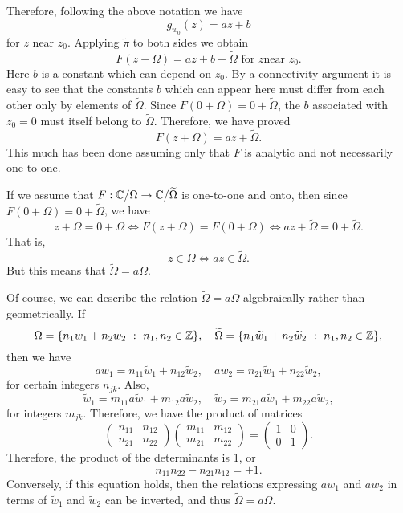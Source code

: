 \documentclass[a4paper,11pt]{article}
\begin{document}
\begin{mdframed}
  Therefore, following the above notation we have
  $$
  g_{w_0}(z) = az + b
  $$
  for $z$ near $z_0$.  Applying $\widetilde{\pi}$ to both sides we
  obtain
  $$
  F(z + \Omega) = az + b + \widetilde{\Omega} \text{ for } z \text{
    near } z_0.
  $$
  Here $b$ is a constant which can depend on $z_0$.  By a connectivity
  argument it is easy to see that the constants $b$ which can appear
  here must differ from each other only by elements of
  $\widetilde{\Omega}$.  Since $F(0 + \Omega) = 0 +
  \widetilde{\Omega}$, the $b$ associated with $z_0 = 0$ must itself
  belong to $\widetilde{\Omega}$.  Therefore, we have proved
  $$
  F(z + \Omega) = az + \widetilde{\Omega}.
  $$
  This much has been done assuming only that $F$ is analytic and not
  necessarily one-to-one.

  If we assume that $F : {\mathbb C} / \Omega \to {\mathbb C} / \widetilde{\Omega}$
  is one-to-one and onto, then since $F(0 + \Omega) = 0 +
  \widetilde{\Omega}$, we have
  $$
  z + \Omega = 0 + \Omega
  \Leftrightarrow F(z + \Omega) = F(0 + \Omega)
  \Leftrightarrow az + \widetilde{\Omega} = 0 + \widetilde{\Omega}.
  $$
  That is,
  $$
  z \in \Omega \Leftrightarrow az \in \widetilde{\Omega}.
  $$
  But this means that $\widetilde{\Omega} = a\Omega$.
\end{mdframed}

Of course, we can describe the relation $\widetilde{\Omega} = a\Omega$
algebraically rather than geometrically.  If
$$
\Omega = \{n_1 w_1 + n_2 w_2 ~:~ n_1, n_2 \in {\mathbb Z}\},\quad
\widetilde{\Omega} = \{n_1 \widetilde{w}_1 + n_2 \widetilde{w}_2 
~:~ n_1, n_2 \in {\mathbb Z}\},
$$
then we have
$$
aw_1 = n_{11} \widetilde{w}_1 + n_{12} \widetilde{w}_2,\quad
aw_2 = n_{21} \widetilde{w}_1 + n_{22} \widetilde{w}_2,
$$
for certain integers $n_{jk}$.  Also,
$$
\widetilde{w}_1 = m_{11} a\widetilde{w}_1 + m_{12} a\widetilde{w}_2,\quad
\widetilde{w}_2 = m_{21} a\widetilde{w}_1 + m_{22} a\widetilde{w}_2,
$$
for integers $m_{jk}$.  Therefore, we have the product of matrices
$$
\begin{pmatrix}
  n_{11} & n_{12} \\ n_{21} & n_{22}
\end{pmatrix}
\begin{pmatrix}
  m_{11} & m_{12} \\ m_{21} & m_{22}
\end{pmatrix}
=
\begin{pmatrix}
  1 & 0 \\ 0 & 1
\end{pmatrix}.
$$
Therefore, the product of the determinants is 1, or
$$
n_{11} n_{22} - n_{21} n_{12} = \pm 1.
$$
Conversely, if this equation holds, then the relations expressing
$aw_1$ and $aw_2$ in terms of $\widetilde{w}_1$ and $\widetilde{w}_2$
can be inverted, and thus $\widetilde{\Omega} = a \Omega$.
\end{document}

